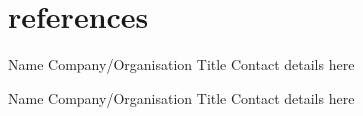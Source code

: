 \documentclass[]{friggeri-cv} %
\begin{document}

\section{references}


\begin{entrylist}


\entry
{}
{Name}
{Company/Organisation}
{Title}
{
Contact details here
}


\entry
{}
{Name}
{Company/Organisation}
{Title}
{
Contact details here
}

\end{entrylist} 

\end{document}
